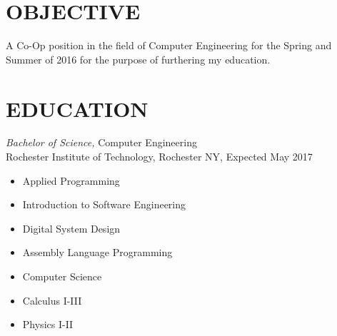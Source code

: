 \documentclass[line,margin]{res}
\begin{document}
\setlength\columnsep{-30pt}
\address{56 South Street Drury, MA}
\address{CRC3510@RIT.EDU}
\address{(413) 376-5034}

 
\begin{resume}
 \setlength\multicolsep{2pt}

\section{OBJECTIVE}   
	A Co-Op position in the field of Computer Engineering for the Spring and Summer of 2016 for the purpose of furthering my education.  
 
\section{EDUCATION} {\sl Bachelor of Science,} Computer Engineering \\
                Rochester Institute of Technology, Rochester NY, 
				Expected May 2017 %
				\begin{multicols}{2}
					\begin{itemize}
							\itemsep -2pt
						\item[] Applied Programming
						\item[] Introduction to Software Engineering
						\item[] Digital System Design
						\item[] Assembly Language Programming
						\item[] Computer Science
						\item[] Calculus I-III
						\item[] Physics I-II
					\end{itemize}
				\end{multicols}
 

\end{resume}
\end{document}
